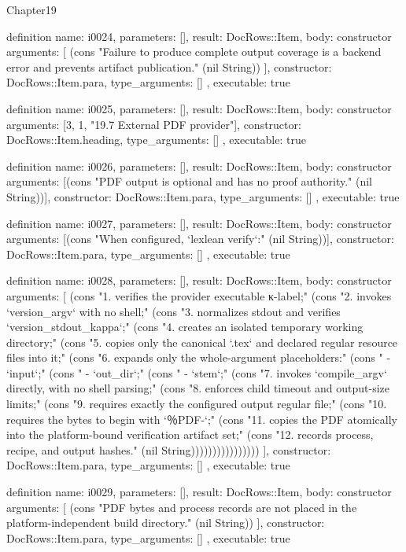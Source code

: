 \begin{lexlean}{Chapter19}
\begin{semanticmodule}
definition{
  name: i0024,
  parameters: [],
  result: DocRows::Item,
  body: constructor{
    arguments: [
      (cons "Failure to produce complete output coverage is a backend error and prevents artifact publication." (nil String))
    ],
    constructor: DocRows::Item.para,
    type_arguments: []
  },
  executable: true
}

definition{
  name: i0025,
  parameters: [],
  result: DocRows::Item,
  body: constructor{
    arguments: [3, 1, "19.7 External PDF provider"],
    constructor: DocRows::Item.heading,
    type_arguments: []
  },
  executable: true
}

definition{
  name: i0026,
  parameters: [],
  result: DocRows::Item,
  body: constructor{
    arguments: [(cons "PDF output is optional and has no proof authority." (nil String))],
    constructor: DocRows::Item.para,
    type_arguments: []
  },
  executable: true
}

definition{
  name: i0027,
  parameters: [],
  result: DocRows::Item,
  body: constructor{
    arguments: [(cons "When configured, `lexlean verify`:" (nil String))],
    constructor: DocRows::Item.para,
    type_arguments: []
  },
  executable: true
}

definition{
  name: i0028,
  parameters: [],
  result: DocRows::Item,
  body: constructor{
    arguments: [
      (cons "1. verifies the provider executable κ-label;" (cons "2. invokes `version_argv` with no shell;" (cons "3. normalizes stdout and verifies `version_stdout_kappa`;" (cons "4. creates an isolated temporary working directory;" (cons "5. copies only the canonical `.tex` and declared regular resource files into it;" (cons "6. expands only the whole-argument placeholders:" (cons "   - `{input}`;" (cons "   - `{out_dir}`;" (cons "   - `{stem}`;" (cons "7. invokes `compile_argv` directly, with no shell parsing;" (cons "8. enforces child timeout and output-size limits;" (cons "9. requires exactly the configured output regular file;" (cons "10. requires the bytes to begin with `％PDF-`;" (cons "11. copies the PDF atomically into the platform-bound verification artifact set;" (cons "12. records process, recipe, and output hashes." (nil String))))))))))))))))
    ],
    constructor: DocRows::Item.para,
    type_arguments: []
  },
  executable: true
}

definition{
  name: i0029,
  parameters: [],
  result: DocRows::Item,
  body: constructor{
    arguments: [
      (cons "PDF bytes and process records are not placed in the platform-independent build directory." (nil String))
    ],
    constructor: DocRows::Item.para,
    type_arguments: []
  },
  executable: true
}


\end{semanticmodule}
\end{lexlean}
